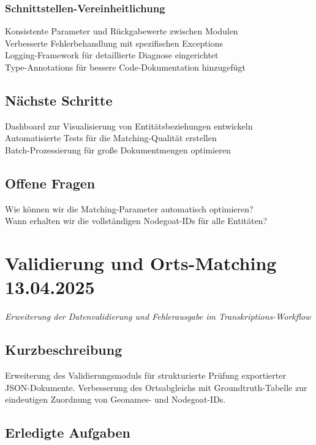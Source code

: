 \documentclass{article}
\begin{document}
\subsubsection*{\small Schnittstellen-Vereinheitlichung}
 Konsistente Parameter und Rückgabewerte zwischen Modulen\\
 Verbesserte Fehlerbehandlung mit spezifischen Exceptions\\
 Logging-Framework für detaillierte Diagnose eingerichtet\\
 Type-Annotations für bessere Code-Dokumentation hinzugefügt

\subsection*{Nächste Schritte}
 Dashboard zur Visualisierung von Entitätsbeziehungen entwickeln\\
 Automatisierte Tests für die Matching-Qualität erstellen\\
 Batch-Prozessierung für große Dokumentmengen optimieren

\subsection*{Offene Fragen}
 Wie können wir die Matching-Parameter automatisch optimieren?\\
 Wann erhalten wir die vollständigen Nodegoat-IDs für alle Entitäten?\\

\noindent\hrulefill

\section{Validierung und Orts-Matching \small 13.04.2025}
\small\textit{Erweiterung der Datenvalidierung und Fehlerausgabe im Transkriptions-Workflow}\\

\subsection*{Kurzbeschreibung}

Erweiterung des Validierungsmoduls für strukturierte Prüfung exportierter JSON-Dokumente. Verbesserung des Ortsabgleichs mit Groundtruth-Tabelle zur eindeutigen Zuordnung von Geonames- und Nodegoat-IDs.

\subsection*{Erledigte Aufgaben}
\end{document}
